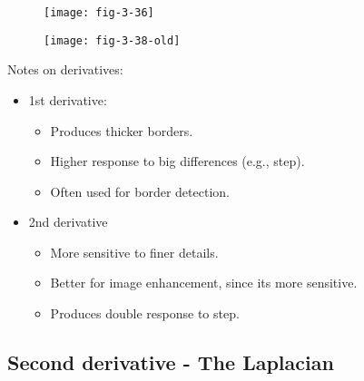 
\begin{frame}
\begin{figure}
\centering
\texttt{[image: fig-3-36]}
\end{figure}
\end{frame}


\begin{frame}
\begin{figure}
\centering
\texttt{[image: fig-3-38-old]}
\end{figure}
\end{frame}


\begin{frame}
Notes on derivatives:
\begin{itemize}
\item 1st derivative:
\begin{itemize}
\item Produces thicker borders.
\item Higher response to big differences (e.g., step).
\item Often used for border detection.
\end{itemize} 
\item 2nd derivative
\begin{itemize}
\item More sensitive to finer details.
\item Better for image enhancement, since its more sensitive.
\item Produces double response to step.
\end{itemize}
\end{itemize}
\end{frame}


\subsection{Second derivative - The Laplacian}


